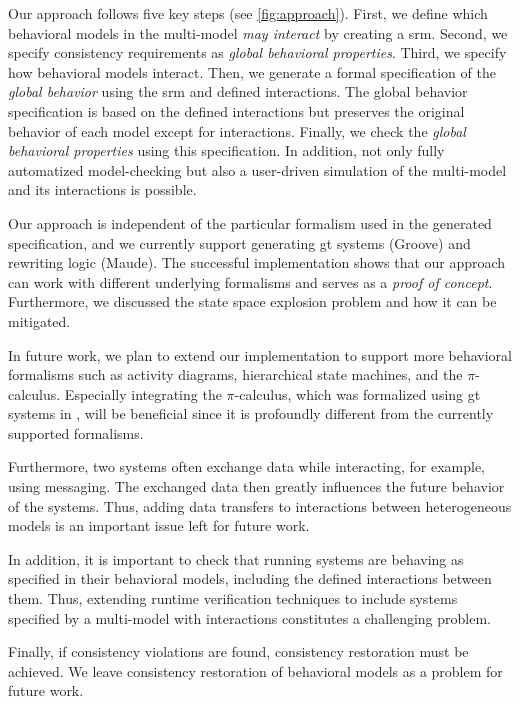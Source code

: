\documentclass{jot}
\begin{document}
Our approach follows five key steps (see \cref{fig:approach}).
First, we define which behavioral models in the multi-model \emph{may interact} by creating a \gls*{srm}.
Second, we specify consistency requirements as \emph{global behavioral properties}.
Third, we specify how behavioral models interact.
Then, we generate a formal specification of the \emph{global behavior} using the \gls*{srm} and defined interactions.
The global behavior specification is based on the defined interactions but preserves the original behavior of each model except for interactions.
Finally, we check the \emph{global behavioral properties} using this specification.
In addition, not only fully automatized model-checking but also a user-driven simulation of the multi-model and its interactions is possible.

Our approach is independent of the particular formalism used in the generated specification, and we currently support generating \gls*{gt} systems (Groove) and rewriting logic (Maude).
The successful implementation shows that our approach can work with different underlying formalisms and serves as a \emph{proof of concept}.
Furthermore, we discussed the state space explosion problem and how it can be mitigated.

In future work, we plan to extend our implementation to support more behavioral formalisms such as activity diagrams, hierarchical state machines, and the $\pi$-calculus.
Especially integrating the $\pi$-calculus, which was formalized using \gls*{gt} systems in \cite{gadducciGraphRewritingPcalculus2007}, will be beneficial since it is profoundly different from the currently supported formalisms.

Furthermore, two systems often exchange data while interacting, for example, using messaging.
The exchanged data then greatly influences the future behavior of the systems.
Thus, adding data transfers to interactions between heterogeneous models is an important issue left for future work.

In addition, it is important to check that running systems are behaving as specified in their behavioral models, including the defined interactions between them.
Thus, extending runtime verification techniques to include systems specified by a multi-model with interactions constitutes a challenging problem.

Finally, if consistency violations are found, consistency restoration must be achieved.
We leave consistency restoration of behavioral models as a problem for future work.
\end{document}
